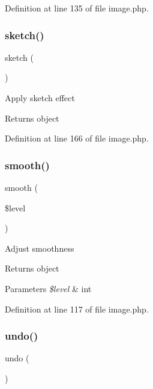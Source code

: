 Definition at line 135 of file image.\+php.

\hypertarget{class_image_afc92209cb2a19193d46a9338b13a3bb9}{}\label{class_image_afc92209cb2a19193d46a9338b13a3bb9} 
\subsubsection{\texorpdfstring{sketch()}{sketch()}}
{\footnotesize\ttfamily sketch (\begin{DoxyParamCaption}{ }\end{DoxyParamCaption})}

Apply sketch effect \begin{DoxyReturn}{Returns}
object 
\end{DoxyReturn}


Definition at line 166 of file image.\+php.

\hypertarget{class_image_a7ebc6366f3da2bf2af1608663fdb7a09}{}\label{class_image_a7ebc6366f3da2bf2af1608663fdb7a09} 
\subsubsection{\texorpdfstring{smooth()}{smooth()}}
{\footnotesize\ttfamily smooth (\begin{DoxyParamCaption}\item[{}]{\$level }\end{DoxyParamCaption})}

Adjust smoothness \begin{DoxyReturn}{Returns}
object 
\end{DoxyReturn}

\begin{DoxyParams}{Parameters}
{\em \$level} & int \\
\hline
\end{DoxyParams}


Definition at line 117 of file image.\+php.

\hypertarget{class_image_a0347027efc0e46047792065615ac94eb}{}\label{class_image_a0347027efc0e46047792065615ac94eb} 
\subsubsection{\texorpdfstring{undo()}{undo()}}
{\footnotesize\ttfamily undo (\begin{DoxyParamCaption}{ }\end{DoxyParamCaption})}

